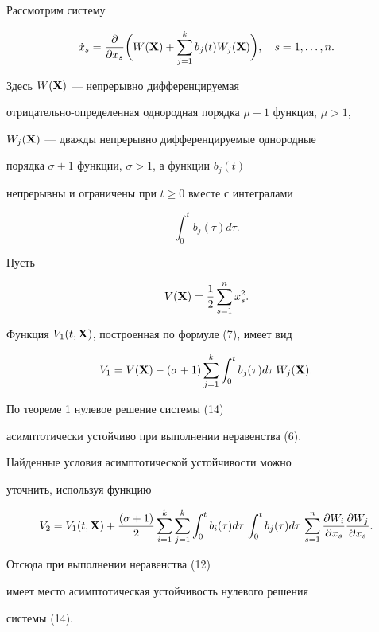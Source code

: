  


\begin{exam} Рассмотрим систему 


\begin{equation} 


\Dot x_s=\frac{\partial}{\partial x_s}\biggl( W(\bx)+ 


\sum^k_{j=1}b_j(t)W_j(\bx)\biggr),\quad s=1,\dotsc,n. 


\end{equation} 


Здесь $W(\bold X)$ --- непрерывно дифференцируемая 


отрицательно-определенная однородная порядка $\mu+1$ функция, $\mu>1$,


$W_j(\bold X)$ --- дважды непрерывно дифференцируемые однородные 


порядка $\sigma+1$ функции, $\sigma>1$, а функции $b_j(t)$ 


непрерывны и ограничены при $t\ge 0$ вместе с интегралами 


$$ 


\int^t_0 b_j(\tau)d\tau. 


$$ 


 


Пусть 


$$ 


V(\bx)=\frac{1}{2}\sum^n_{s=1}x^2_s. 


$$ 


Функция $V_1(t,\bold X)$, построенная по формуле (7), имеет вид 


$$ 


V_1=V(\bx)-(\sigma+1)\sum^k_{j=1}\int^t_0 b_j(\tau)d\tau\,W_j(\bx). 


$$ 


По теореме 1 нулевое решение системы (14) 


асимптотически устойчиво при выполнении неравенства (6). 


 


Найденные условия асимптотической устойчивости можно 


уточнить, используя функцию 


$$ 


V_2=V_1(t,\bx)+\frac{(\sigma+1)}{2}\sum^k_{i=1}\sum^k_{j=1} 


\int^t_0 b_i(\tau)d\tau\,\int^t_0 b_j(\tau)d\tau\, 


\sum^n_{s=1}\frac{\partial W_i}{\partial x_s} 


\frac{\partial W_j}{\partial x_s}. 


$$ 


Отсюда при выполнении неравенства (12) 


имеет место асимптотическая устойчивость нулевого решения 


системы (14). 


\end{exam} 


